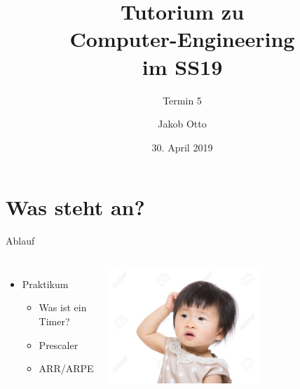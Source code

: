 \documentclass[aspectratio=169,presentation]{beamer}
\date{30. April 2019}
\newcommand{\terminNummer}{5}
\begin{document}
\title[CE Tutorium]{Tutorium zu\\Computer-Engineering\\im SS19}
\subtitle{Termin \terminNummer}
\author[Otto]{Jakob Otto}
\subject{CE Tutorium}

\titlepage

\section{Was steht an?}
\begin{frame}{Ablauf}
	\begin{columns}
		\begin{itemize}
			\item Praktikum
      \begin{itemize}
        \item Was ist ein Timer?
        \item Prescaler
        \item ARR/ARPE
			\end{itemize}
		\end{itemize}
		\includegraphics[width=0.6\textwidth]{kratzen}
	\end{columns}
\end{frame}

\end{document}
